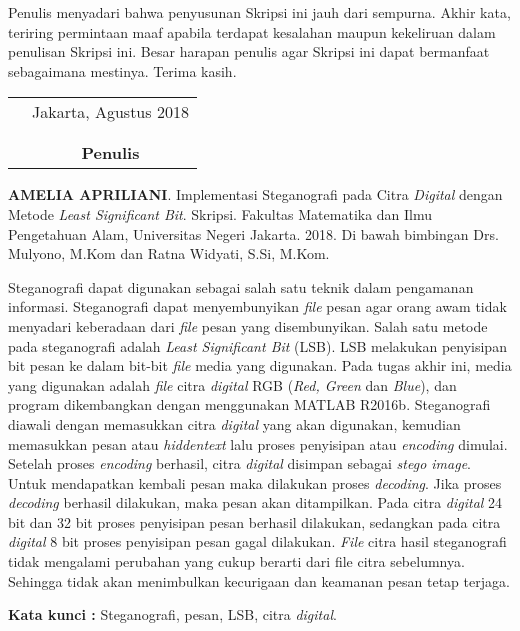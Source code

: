 \documentclass{jtetiskripsi}
\begin{document}
Penulis menyadari bahwa penyusunan Skripsi ini jauh dari sempurna. Akhir kata, teriring permintaan maaf apabila terdapat kesalahan maupun kekeliruan dalam penulisan Skripsi ini. Besar harapan penulis agar Skripsi ini dapat bermanfaat sebagaimana mestinya. Terima kasih.

\vspace{.5cm}

\begin{tabular}{p{7.5cm}c}
	&Jakarta, Agustus 2018\\
	&\\
	&\\
	&\textbf{Penulis}
\end{tabular}

\begin{abstractind}
\textbf{AMELIA APRILIANI}. Implementasi Steganografi pada Citra \emph{Digital} dengan Metode \emph{Least Significant Bit}. Skripsi. Fakultas Matematika dan Ilmu Pengetahuan Alam, Universitas Negeri Jakarta. 2018. Di bawah bimbingan Drs. Mulyono, M.Kom dan Ratna Widyati, S.Si, M.Kom.
\vskip1cm
	
	 Steganografi dapat digunakan sebagai salah satu teknik dalam pengamanan informasi. Steganografi dapat menyembunyikan \emph{file} pesan agar orang awam tidak menyadari keberadaan dari \emph{file} pesan yang disembunyikan. Salah satu metode pada steganografi adalah \emph{Least Significant Bit} (LSB). LSB melakukan penyisipan bit pesan ke dalam bit-bit \emph{file} media yang digunakan. Pada tugas akhir ini, media yang digunakan adalah \emph{file} citra \emph{digital} RGB (\emph{Red, Green} dan \emph{Blue}), dan program dikembangkan dengan menggunakan MATLAB R2016b. Steganografi diawali dengan memasukkan citra \emph{digital} yang akan digunakan, kemudian memasukkan pesan atau \emph{hiddentext} lalu proses penyisipan atau \emph{encoding} dimulai. Setelah proses \emph{encoding} berhasil, citra \emph{digital} disimpan sebagai \emph{stego image}. Untuk mendapatkan kembali pesan maka dilakukan proses \emph{decoding}. Jika proses \emph{decoding} berhasil dilakukan, maka pesan akan ditampilkan. Pada citra \emph{digital} 24 bit dan 32 bit proses penyisipan pesan berhasil dilakukan, sedangkan pada citra \emph{digital} 8 bit proses penyisipan pesan gagal dilakukan. \emph{File} citra hasil steganografi tidak mengalami perubahan yang cukup berarti dari file citra sebelumnya. Sehingga tidak akan menimbulkan kecurigaan dan keamanan pesan tetap terjaga.
	
	\bigskip
	\noindent
	\textbf{Kata kunci :} Steganografi, pesan, LSB, citra \emph{digital}.
\end{abstractind}
\end{document}
